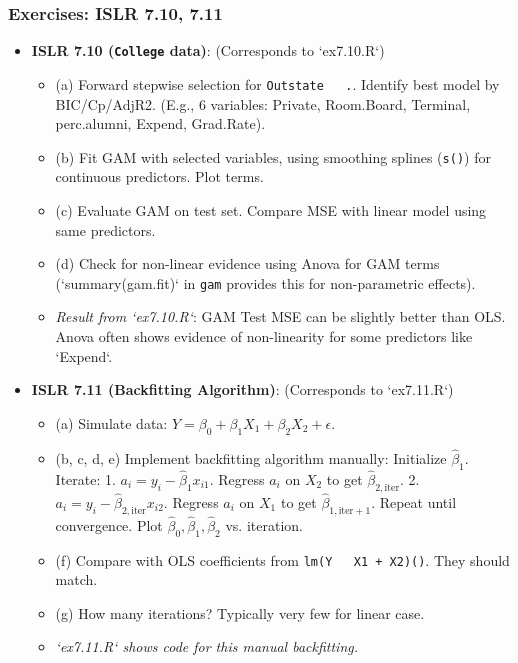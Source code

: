 \documentclass[12pt,a4paper]{article}
\newcommand{\Rpackage}[1]{\texttt{#1}} %
\newcommand{\Rfunction}[1]{\texttt{#1()}} %
\newcommand{\Rcode}[1]{\texttt{#1}} %
\begin{document}
\begin{itemize}
    \subsubsection{Exercises: ISLR 7.10, 7.11}
        \begin{itemize}
            \item \textbf{ISLR 7.10 (\Rpackage{College} data)}: (Corresponds to `ex7.10.R`)
                \begin{itemize}
                    \item (a) Forward stepwise selection for \Rcode{Outstate ~ .}. Identify best model by BIC/Cp/AdjR2. (E.g., 6 variables: Private, Room.Board, Terminal, perc.alumni, Expend, Grad.Rate).
                    \item (b) Fit GAM with selected variables, using smoothing splines (\Rfunction{s}) for continuous predictors. Plot terms.
                    \item (c) Evaluate GAM on test set. Compare MSE with linear model using same predictors.
                    \item (d) Check for non-linear evidence using Anova for GAM terms (`summary(gam.fit)` in \Rpackage{gam} provides this for non-parametric effects).
                    \item \textit{Result from `ex7.10.R`}: GAM Test MSE can be slightly better than OLS. Anova often shows evidence of non-linearity for some predictors like `Expend`.
                \end{itemize}
            \item \textbf{ISLR 7.11 (Backfitting Algorithm)}: (Corresponds to `ex7.11.R`)
                \begin{itemize}
                    \item (a) Simulate data: $Y = \beta_0 + \beta_1 X_1 + \beta_2 X_2 + \epsilon$.
                    \item (b, c, d, e) Implement backfitting algorithm manually:
                        Initialize $\hat{\beta}_1$. Iterate:
                        1. $a_i = y_i - \hat{\beta}_1 x_{i1}$. Regress $a_i$ on $X_2$ to get $\hat{\beta}_{2, \text{iter}}$.
                        2. $a_i = y_i - \hat{\beta}_{2, \text{iter}} x_{i2}$. Regress $a_i$ on $X_1$ to get $\hat{\beta}_{1, \text{iter}+1}$.
                        Repeat until convergence. Plot $\hat{\beta}_0, \hat{\beta}_1, \hat{\beta}_2$ vs. iteration.
                    \item (f) Compare with OLS coefficients from \Rfunction{lm(Y ~ X1 + X2)}. They should match.
                    \item (g) How many iterations? Typically very few for linear case.
                    \item \textit{`ex7.11.R` shows code for this manual backfitting.}
                \end{itemize}
        \end{itemize}


\end{itemize}
\end{document}

